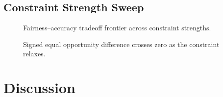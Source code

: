 \documentclass[11pt]{article}
\begin{document}
\subsection{Constraint Strength Sweep}

\begin{figure}[H]
\caption{Fairness--accuracy tradeoff frontier across constraint strengths.}
\label{fig:act3_frontier}
\end{figure}

\begin{figure}[H]
\caption{Signed equal opportunity difference crosses zero as the constraint relaxes.}
\label{fig:act3_signflip}
\end{figure}

\section{Discussion}
\end{document}
